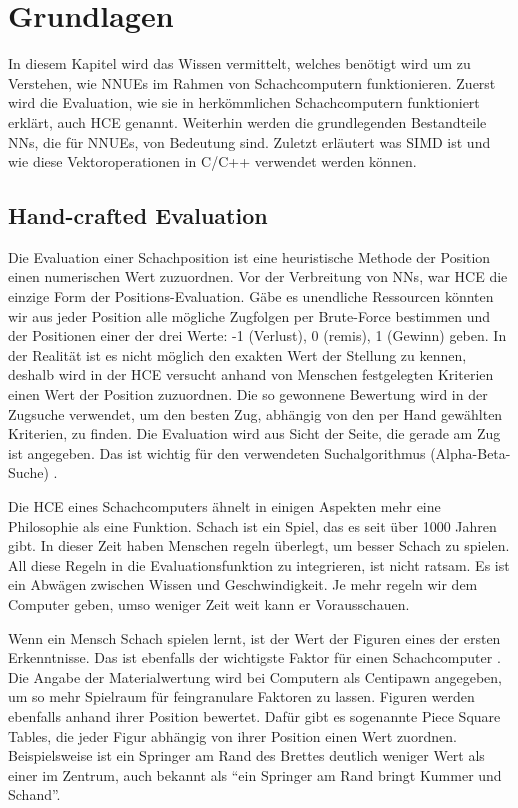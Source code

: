 \chapter{Grundlagen}

In diesem Kapitel wird das Wissen vermittelt, welches benötigt wird um zu Verstehen, wie \acp{NNUE} im Rahmen von Schachcomputern funktionieren. Zuerst wird die Evaluation, wie sie in herkömmlichen Schachcomputern funktioniert erklärt, auch \ac{HCE} genannt. Weiterhin werden die grundlegenden Bestandteile \acp{NN}, die für \acp{NNUE}, von Bedeutung sind. Zuletzt erläutert was \ac{SIMD} ist und wie diese Vektoroperationen in C/C++ verwendet werden können. 

\section{Hand-crafted Evaluation}
\label{chap:HCE}

Die Evaluation einer Schachposition ist eine heuristische Methode der Position einen numerischen Wert zuzuordnen. Vor der Verbreitung von \acp{NN}, war \ac{HCE} die einzige Form der Positions-Evaluation. Gäbe es unendliche Ressourcen könnten wir aus jeder Position alle mögliche Zugfolgen per Brute-Force bestimmen und der Positionen einer der drei Werte: -1 (Verlust), 0 (remis), 1 (Gewinn) geben. In der Realität ist es nicht möglich den exakten Wert der Stellung zu kennen, deshalb wird in der \ac{HCE} versucht anhand von Menschen festgelegten Kriterien einen Wert der Position zuzuordnen. Die so gewonnene Bewertung wird in der Zugsuche verwendet, um den besten Zug, abhängig von den per Hand gewählten Kriterien, zu finden. Die Evaluation wird aus Sicht der Seite, die gerade am Zug ist angegeben. Das ist wichtig für den verwendeten Suchalgorithmus (Alpha-Beta-Suche) \cite{Slagle1969}.

Die \ac{HCE} eines Schachcomputers ähnelt in einigen Aspekten mehr eine Philosophie als eine Funktion. Schach ist ein Spiel, das es seit über 1000 Jahren gibt. In dieser Zeit haben Menschen regeln überlegt, um besser Schach zu spielen. All diese Regeln in die Evaluationsfunktion zu integrieren, ist nicht ratsam. Es ist ein Abwägen zwischen Wissen und Geschwindigkeit. Je mehr regeln wir dem Computer geben, umso weniger Zeit weit kann er Vorausschauen.

Wenn ein Mensch Schach spielen lernt, ist der Wert der Figuren eines der ersten Erkenntnisse. Das ist ebenfalls der wichtigste Faktor für einen Schachcomputer \cite{Levy1988}. Die Angabe der Materialwertung wird bei Computern als Centipawn angegeben, um so mehr Spielraum für feingranulare Faktoren zu lassen. Figuren werden ebenfalls anhand ihrer Position bewertet. Dafür gibt es sogenannte Piece Square Tables, die jeder Figur abhängig von ihrer Position einen Wert zuordnen. Beispielsweise ist ein Springer am Rand des Brettes deutlich weniger Wert als einer im Zentrum, auch bekannt als \enquote{ein Springer am Rand bringt Kummer und Schand}.

